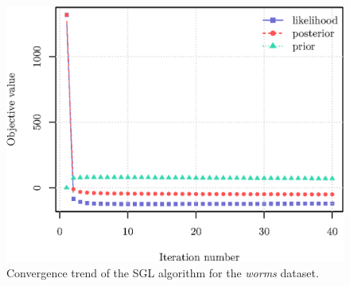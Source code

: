 \begin{figure}[!htb]
  \centering
  \includegraphics[width=.5\textwidth]{clusters/latex/figures/worms_trend.eps}
  \caption{Convergence trend of the \textsf{SGL} algorithm for the \textit{worms} dataset.}
  \label{fig:worms_trend}
\end{figure}

